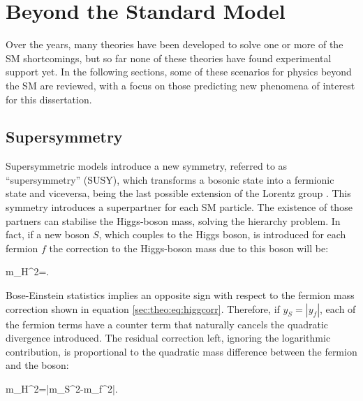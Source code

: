 \section{Beyond the Standard Model}
Over the years, many theories have been developed to solve one or more of the SM shortcomings, but so far none of these theories have found experimental support yet. In the following sections, some of these scenarios for physics beyond the SM are reviewed, with a focus on those predicting new phenomena of interest for this dissertation.

\subsection{Supersymmetry} 
Supersymmetric models introduce a new symmetry, referred to as ``supersymmetry'' (SUSY), which transforms a bosonic state into a fermionic state and viceversa, being the last possible extension of the Lorentz group \cite{Haag:1974qh,Drees:1996ca}. This symmetry introduces a superpartner for each SM particle. The existence of those partners can stabilise the Higgs-boson mass, solving the hierarchy problem. In fact, if a new boson $S$, which couples to the Higgs boson, is introduced for each fermion $f$ the correction to the Higgs-boson mass due to this boson will be:

\be
\delta m_{H}^{2}=.
\ee  

\noindent Bose-Einstein statistics implies an opposite sign with respect to the fermion mass correction shown in equation \ref{sec:theo:eq:higgcorr}. Therefore, if $y_{S} = |y_{f}|$, each of the fermion terms have a counter term that naturally cancels the quadratic divergence introduced. The residual correction left, ignoring the logarithmic contribution, is proportional to the quadratic mass difference between the fermion and the boson:

\be
\delta m_{H}^{2}=|m_{S}^{2}-m_{f}^{2}|.
\ee

